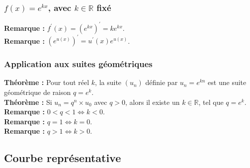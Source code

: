 \documentclass[a4paper,titlepage]{article}
\begin{document}
        \subsubsection[$f\left(x\right)=e^{kx}$, avec $k\in\mathbb{R}$ fixé]{\boldmath$f\left(x\right)=e^{kx}$, avec $k\in\mathbb{R}$ fixé}
            \textbf{Remarque :} $f^{\prime}\left(x\right)=\left(e^{kx}\right)^{\prime}=ke^{kx}$.
            \\
            \textbf{Remarque :} $\left(e^{u\left(x\right)}\right)^{\prime}=u^{\prime}\left(x\right)e^{u\left(x\right)}$.
        \subsubsection{Application aux suites géométriques}
            \textbf{Théorème :} Pour tout réel $k$, la suite $\left(u_{n}\right)$ définie par $u_{n}=e^{kn}$ est une suite géométrique de raison $q=e^{k}$.
            \\
            \textbf{Théorème :} Si $u_{n}=q^{n}\times u_{0}$ avec $q>0$, alors il existe un $k\in\mathbb{R}$, tel que $q=e^{k}$.
            \\
            \textbf{Remarque :} $0<q<1\Leftrightarrow k<0$.
            \\
            \textbf{Remarque :} $q=1\Leftrightarrow k=0$.
            \\
            \textbf{Remarque :} $q>1\Leftrightarrow k>0$.
    \subsection{Courbe représentative}
        \begin{center}
        \end{center}
\end{document}
